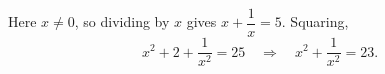 Here $x\ne0$, so dividing by $x$ gives $x+\dfrac{1}{x}=5$. Squaring,
\[
x^2+2+\dfrac{1}{x^2}=25\quad\Longrightarrow\quad x^2+\dfrac{1}{x^2}=\boxed{23}.
\]
